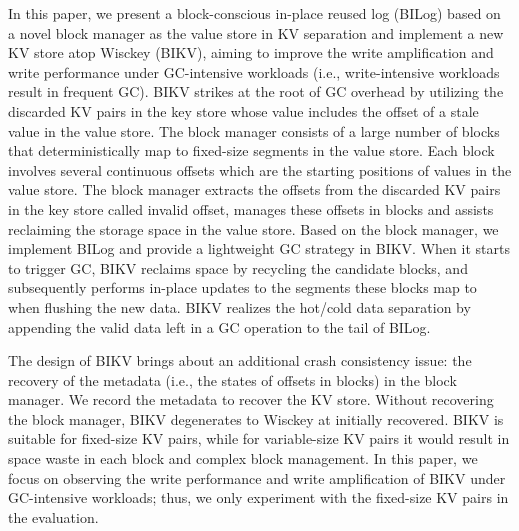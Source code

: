 \documentclass[sigconf]{acmart}
\begin{document}

In this paper, we present a block-conscious in-place reused log (BILog) based on a novel block manager as the value store in KV separation and implement a new KV store atop Wisckey (BIKV), aiming to improve the write amplification and write performance under GC-intensive workloads (i.e., write-intensive workloads result in frequent GC). BIKV strikes at the root of GC overhead by utilizing the discarded KV pairs in the key store whose value includes the offset of a stale value in the value store. The block manager consists of a large number of blocks that deterministically map to fixed-size segments in the value store. Each block involves several continuous offsets which are the starting positions of values in the value store. The block manager extracts the offsets from the discarded KV pairs in the key store called invalid offset, manages these offsets in blocks and assists reclaiming the storage space in the value store. Based on the block manager, we implement BILog and provide a lightweight GC strategy in BIKV. When it starts to trigger GC, BIKV reclaims space by recycling the candidate blocks, and subsequently performs in-place updates to the segments these blocks map to when flushing the new data. BIKV realizes the hot/cold data separation by appending the valid data left in a GC operation to the tail of BILog.

The design of BIKV brings about an additional crash consistency issue: the recovery of the metadata (i.e., the states of offsets in blocks) in the block manager. We record the metadata to recover the KV store. Without recovering the block manager, BIKV degenerates to Wisckey at initially recovered. BIKV is suitable for fixed-size KV pairs, while for variable-size KV pairs it would result in space waste in each block and complex block management. In this paper, we focus on observing the write performance and write amplification of BIKV under GC-intensive workloads; thus, we only experiment with the fixed-size KV pairs in the evaluation.
\end{document}
